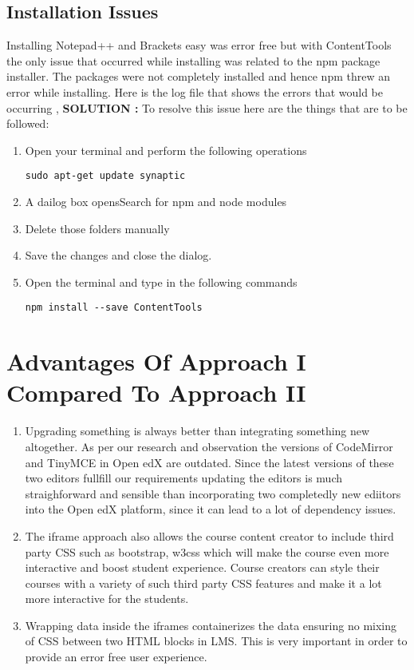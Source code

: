 \subsection{Installation Issues}
Installing Notepad++ and Brackets easy was error free but with ContentTools the only issue
that occurred while installing was related to the npm package installer. \newline
The packages were not completely installed and hence npm threw an error while
installing. \newline \newline
Here is the log file that shows the errors that would be occurring , \newline 
[\url{https://drive.google.com/open?id=1KUe3jcAPg8DpxmhshPUBYPKya_B-oRSt}]
\newline 
\newline
\textbf{SOLUTION :} To resolve this issue here are the things that are to be followed: \newline
\begin{enumerate}
\item Open your terminal and perform the following operations 
\begin{center}\verb=sudo apt-get update synaptic=\end{center}
\item A dailog box opensSearch for npm and node modules
\item Delete those folders manually
\item Save the changes and close the dialog.
\item Open the terminal and type in the following commands
 \begin{center}\verb=npm install --save ContentTools=\end{center}

\end{enumerate}
\section{Advantages Of Approach I Compared To Approach II}
\begin{enumerate}
\item Upgrading something is always better than integrating something new altogether. As per
our research and observation the versions of CodeMirror and TinyMCE in Open edX are
outdated. Since the latest versions of these two editors fullfill our requirements updating the
editors is much straighforward and sensible than incorporating two completedly new ediitors
into the Open edX platform, since it can lead to a lot of dependency issues.
\item The iframe approach also allows the course content creator to include third party CSS
such as bootstrap, w3css which will make the course even more interactive and boost
student experience. Course creators can style their courses with a variety of such third party
CSS features and make it a lot more interactive for the students.
\item Wrapping data inside the iframes containerizes the data ensuring no mixing of CSS
between two HTML blocks in LMS. This is very important in order to provide an error free
user experience.
\end{enumerate}


